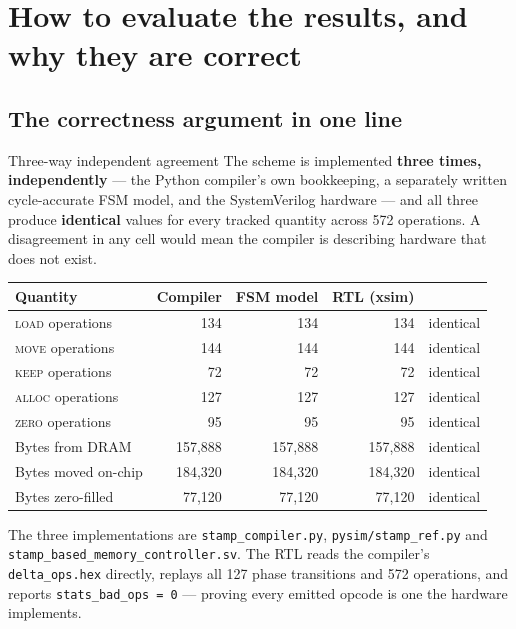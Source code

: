 \documentclass[11pt,a4paper]{article}
\newcommand{\op}[1]{\textsc{#1}}
\newcommand{\file}[1]{\texttt{\small #1}}
\begin{document}
\section{How to evaluate the results, and why they are correct}

\subsection{The correctness argument in one line}

\begin{keybox}{Three-way independent agreement}
The scheme is implemented \textbf{three times, independently} --- the Python
compiler's own bookkeeping, a separately written cycle-accurate FSM model, and
the SystemVerilog hardware --- and all three produce \textbf{identical} values
for every tracked quantity across 572 operations. A disagreement in any cell
would mean the compiler is describing hardware that does not exist.
\end{keybox}

\begin{center}
\small
\begin{tabular}{@{}lrrrl@{}}
\toprule
\textbf{Quantity} & \textbf{Compiler} & \textbf{FSM model} & \textbf{RTL (xsim)} & \\
\midrule
\op{load} operations   & 134 & 134 & 134 & identical \\
\op{move} operations   & 144 & 144 & 144 & identical \\
\op{keep} operations   & 72  & 72  & 72  & identical \\
\op{alloc} operations  & 127 & 127 & 127 & identical \\
\op{zero} operations   & 95  & 95  & 95  & identical \\
Bytes from DRAM        & 157{,}888 & 157{,}888 & 157{,}888 & identical \\
Bytes moved on-chip    & 184{,}320 & 184{,}320 & 184{,}320 & identical \\
Bytes zero-filled      & 77{,}120  & 77{,}120  & 77{,}120  & identical \\
\bottomrule
\end{tabular}
\end{center}

\noindent The three implementations are \file{stamp\_compiler.py},
\file{pysim/stamp\_ref.py} and \file{stamp\_based\_memory\_controller.sv}. The
RTL reads the compiler's \file{delta\_ops.hex} directly, replays all 127 phase
transitions and 572 operations, and reports \file{stats\_bad\_ops = 0} ---
proving every emitted opcode is one the hardware implements.
\end{document}
